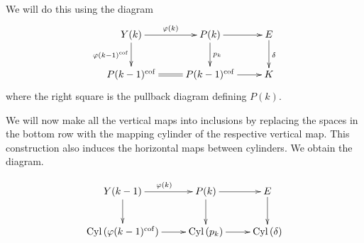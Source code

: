 \documentclass[12pt,a4wide]{article}
\theoremstyle{plain}
\theoremstyle{definition}
\newcommand{\cofr}{\mathrm{cof}}
\newcommand{\Pst}[1]{P(#1)}
\newcommand{\Yst}[1]{Y(#1)}
\newcommand{\towercompmap}[2]{#1(#2)}
\DeclareMathOperator\MCyltemp{{Cyl}}
\newcommand{\MCyl}[1]{\MCyltemp{({#1})}}
\newcommand{\varphist}[1]{\towercompmap{\varphi}{#1}}
\newcommand{\thedimm}{{k}}
\renewcommand\:{\colon}
\newcommand{\dK}{K}
\newcommand{\dE}{E}
\newcommand\cobo{\delta}
\begin{document}
We will do this using the diagram
\[\xymatrix{
\Yst{\thedimm} \ar[d]_{\varphist{\thedimm -1}^\cofr} \ar[r]^{\varphist{\thedimm}} & \Pst{\thedimm} \ar[r] \ar[d]^{p_{\thedimm}}
& \dE \ar[d]^\delta \\
\Pst{\thedimm-1}^\cofr \ar@{=}[r] & \Pst{\thedimm-1}^\cofr \ar[r] & \dK
}
 \]
where the right square is the pullback diagram defining $\Pst{\thedimm}$.

We will now make all the vertical maps into inclusions by replacing the spaces in the bottom row with the mapping cylinder of the respective vertical map. This construction also induces the horizontal maps between cylinders. We obtain the diagram.

\begin{equation}\label{e:two_squares}
\xy *!C\xybox{\xymatrix{
\Yst{\thedimm -1} \ar[d] \ar[r]^{\varphist{\thedimm}}
 & \Pst{\thedimm} \ar[r] \ar[d] & \dE \ar[d]\\
\MCyl{\varphist{\thedimm -1}^\cofr} \ar[r] & \MCyl{p_\thedimm} \ar[r] & \MCyl \cobo
}}\endxy
\end{equation}
\end{document}
